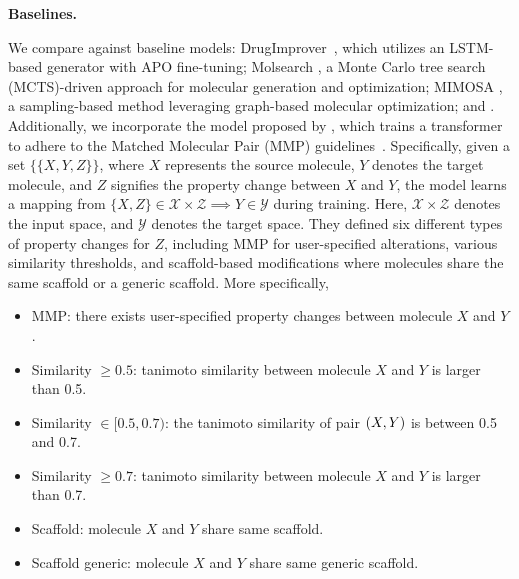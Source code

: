 \textbf{Baselines.}
{
We compare against baseline models: DrugImprover~\citep{liu2023drugimprover}, which utilizes an LSTM-based generator with APO fine-tuning; 
Molsearch \citep{sun2022molsearch}, a Monte Carlo tree search (MCTS)-driven approach for molecular generation and optimization; MIMOSA \citep{fu2021mimosa}, a sampling-based method leveraging graph-based molecular optimization; and . Additionally, we incorporate the model proposed by \citet{he2021molecular, he2022transformer,  loeffler2024reinvent}, which trains a transformer to adhere to the Matched Molecular Pair (MMP) guidelines~\citep{kenny2005structure,tyrchan2017matched}.
Specifically, given a set $\{\{X,Y,Z\}\}$, where $X$ represents the source molecule, $Y$ denotes the target molecule, and $Z$ signifies the property change between $X$ and $Y$, the model learns a mapping from $\{X, Z\} \in \ensuremath{\mathcal{X}} \times \ensuremath{\mathcal{Z}} \implies Y \in \ensuremath{\mathcal{Y}}$ during training. Here, $\ensuremath{\mathcal{X}} \times \ensuremath{\mathcal{Z}}$ denotes the input space, and $\ensuremath{\mathcal{Y}}$ denotes the target space. They defined six different types of property changes for $Z$, including MMP for user-specified alterations, various similarity thresholds, and scaffold-based modifications where molecules share the same scaffold or a generic scaffold. More specifically,
\begin{itemize}[noitemsep, topsep=0pt, partopsep=0pt]
    \item MMP: there exists user-specified property changes between molecule $X$ and $Y$.
    \item Similarity $\geq 0.5$: tanimoto similarity between molecule $X$ and $Y$ is larger than 0.5.
    \item Similarity $\in[0.5, 0.7)$: the tanimoto similarity of pair $ \left( {X,Y} \right) $ is between 0.5 and 0.7.
    \item Similarity $\geq 0.7$: tanimoto similarity between molecule $X$ and $Y$ is larger than 0.7.
    \item Scaffold: molecule $X$ and $Y$ share same scaffold.
    \item Scaffold generic: molecule $X$ and $Y$ share same generic scaffold.
\end{itemize}
}









